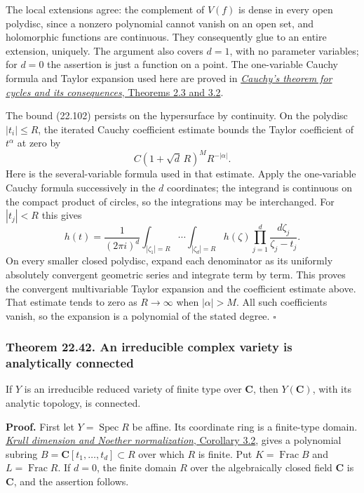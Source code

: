 \documentclass[
  11pt,
  a4paper,
]{article}
\begin{document}
The local extensions agree: the complement of \(V(f)\) is dense in every
open polydisc, since a nonzero polynomial cannot vanish on an open set,
and holomorphic functions are continuous. They consequently glue to an
entire extension, uniquely. The argument also covers \(d=1\), with no
parameter variables; for \(d=0\) the assertion is just a function on a
point. The one-variable Cauchy formula and Taylor expansion used here
are proved in
\href{https://kokunoyumeto.github.io/open-math-courses-public/courses/foundations-of-von-neumann-algebras/cauchy-s-theorem-for-cycles-and-its-consequences.html}{\emph{Cauchy's
theorem for cycles and its consequences}, Theorems 2.3 and 3.2}.

The bound (22.102) persists on the hypersurface by continuity. On the
polydisc \(|t_i|\le R\), the iterated Cauchy coefficient estimate bounds
the Taylor coefficient of \(t^\alpha\) at zero by \[
 C(1+\sqrt d\,R)^M R^{-|\alpha|}.
\] Here is the several-variable formula used in that estimate. Apply the
one-variable Cauchy formula successively in the \(d\) coordinates; the
integrand is continuous on the compact product of circles, so the
integrations may be interchanged. For \(|t_j|<R\) this gives \[
 h(t)=\frac{1}{(2\pi i)^d}
 \int_{|\zeta_1|=R}\cdots\int_{|\zeta_d|=R}
 h(\zeta)\prod_{j=1}^d\frac{d\zeta_j}{\zeta_j-t_j}.
\] On every smaller closed polydisc, expand each denominator as its
uniformly absolutely convergent geometric series and integrate term by
term. This proves the convergent multivariable Taylor expansion and the
coefficient estimate above. That estimate tends to zero as
\(R\to\infty\) when \(|\alpha|>M\). All such coefficients vanish, so the
expansion is a polynomial of the stated degree. \(\square\)

\subsubsection{Theorem 22.42. An irreducible complex variety is
analytically
connected}\label{theorem-22.42.-an-irreducible-complex-variety-is-analytically-connected}

If \(Y\) is an irreducible reduced variety of finite type over
\(\mathbf C\), then \(Y(\mathbf C)\), with its analytic topology, is
connected.

\textbf{Proof.} First let \(Y=\operatorname{Spec}R\) be affine. Its
coordinate ring is a finite-type domain.
\href{https://kokunoyumeto.github.io/open-math-courses-public/courses/AG-CA/AG-CA-09.html\#3-normalization-that-respects-ideals}{\emph{Krull
dimension and Noether normalization}, Corollary 3.2}, gives a polynomial
subring \(B=\mathbf C[t_1,\ldots,t_d]\subset R\) over which \(R\) is
finite. Put \(K=\operatorname{Frac}B\) and \(L=\operatorname{Frac}R\).
If \(d=0\), the finite domain \(R\) over the algebraically closed field
\(\mathbf C\) is \(\mathbf C\), and the assertion follows.
\end{document}
